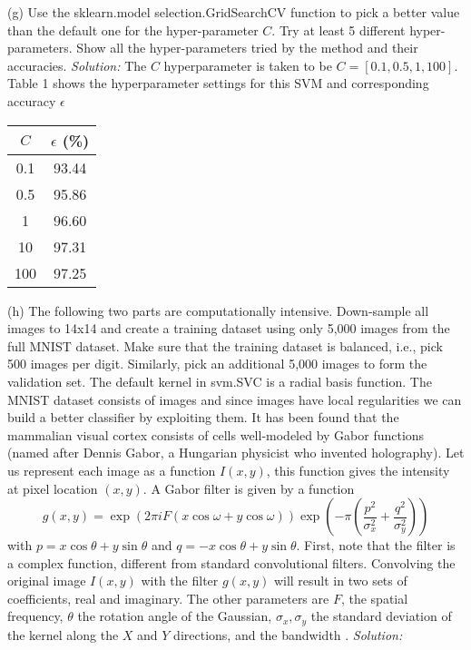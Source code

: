 \documentclass[12pt]{article}
\begin{document}
(g) Use the sklearn.model selection.GridSearchCV function to pick a better value than
the default one for the hyper-parameter $C$. Try at least 5 different hyper-parameters. Show all the
hyper-parameters tried by the method and their accuracies.\newline \newline 
\emph{Solution:} \newline 
The $C$ hyperparameter is taken to be $C = [0.1, 0.5, 1, 100]$. Table 1 shows the hyperparameter settings for this SVM and corresponding accuracy $\epsilon$ 
\begin{center}
 \begin{tabular}{||c c||} 
 \hline
 $C$ & $\epsilon$ (\%)  \\ [0.5ex] 
 \hline  
 0.1 & 93.44  \\ 
 \hline
 0.5 & 95.86  \\
  \hline
 1 &  96.60  \\ 
 \hline
  10 &  97.31 \\ 
  \hline
 100 & 97.25   \\  [1ex] 
 \hline
\end{tabular}
\end{center}

(h) The following two parts are computationally intensive. Down-sample all images to 14x14
and create a training dataset using only 5,000 images from the full MNIST dataset. Make
sure that the training dataset is balanced, i.e., pick 500 images per digit. Similarly, pick an
additional 5,000 images to form the validation set. The default kernel in svm.SVC is a radial basis function. The MNIST dataset consists of images and since images have local regularities we can build a better classifier by exploiting them. It has been
found that the mammalian visual cortex consists of cells well-modeled by Gabor functions (named
after Dennis Gabor, a Hungarian physicist who invented holography). Let us represent each image as
a function $I(x,y)$, this function gives the intensity at pixel location $(x,y)$. A Gabor filter is given by a function
$$ g(x,y) = \exp (2\pi i F(x\cos \omega + y\cos \omega)) \exp (-\pi (\frac{p^{2}}{ \sigma_{x}^{2}}  + \frac{q^{2}}{ \sigma_{y}^{2}} )  ) $$
with $p = x\cos \theta + y\sin \theta$ and $q =  -x\cos \theta + y\sin \theta$. First, note that the filter is a complex function, different from standard  convolutional filters. Convolving the original image $I(x,y)$ with the filter $g(x,y)$ will result in two sets of coefficients, real and imaginary. The other parameters are $F$, the spatial frequency, $\theta$ the rotation angle of the Gaussian, $\sigma_{x},  \sigma_{y}$ the standard deviation of the kernel along the $X$ and $Y$ directions, and the bandwidth .   \newline  \newline 
\emph{Solution:} 
\newline 
\end{document}
